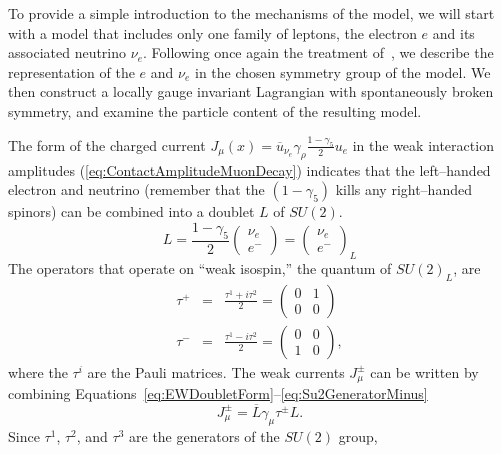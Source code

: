 To provide a simple introduction to the mechanisms of the model, we will start
with a model that includes only one family of leptons, the electron $e$ and its
associated neutrino $\nu_e$. Following once again the treatment
of~\cite{Morii:SMandBSM}, we describe the representation of the $e$ and $\nu_e$
in the chosen symmetry group of the model.  We then construct a locally gauge
invariant Lagrangian with spontaneously broken symmetry, and examine the
particle content of the resulting model.

The form of the charged current $J_\mu(x) = \overline u_{\nu_e} \gamma_\rho
\frac{1 - \gamma_5}{2} u_e$ in the weak interaction amplitudes
(\ref{eq:ContactAmplitudeMuonDecay}) indicates that the left--handed electron
and neutrino 
(remember that the $(1-\gamma_5)$ kills any right--handed spinors) can be
combined into a doublet $L$ of $SU(2)$.  
\begin{equation}
  L = \frac{1 - \gamma_5}{2}
  \left(\begin{array}{c} \nu_e \\ e^- \end{array}\right)
    = \left(\begin{array}{c} \nu_e \\ e^- \end{array}\right)_L
      \label{eq:EWDoubletForm}
\end{equation}
The operators that operate on ``weak isospin,'' the quantum of $SU(2)_L$,
are \begin{eqnarray}
  \tau^+ &=& \frac{\tau^1 + i \tau^2}{2} = 
  \left(\begin{array}{cc} 0 & 1 \\ 0 & 0 \end{array}\right) 
    \label{eq:Su2GeneratorPlus} \\
  \tau^- &=& \frac{\tau^1 - i \tau^2}{2} = 
  \left(\begin{array}{cc} 0 & 0 \\ 1 & 0 \end{array}\right),
    \label{eq:Su2GeneratorMinus}
\end{eqnarray}
where the $\tau^i$ are the Pauli matrices. The weak currents $J_\mu^\pm$ can be
written by combining
Equations~\ref{eq:EWDoubletForm}--\ref{eq:Su2GeneratorMinus}
\begin{equation}
  J_\mu^\pm = \overline L \gamma_\mu \tau^\pm L.
  \label{eq:WeakCurrentInSu2Doublets}
\end{equation}
Since $\tau^1$, $\tau^2$, and $\tau^3$ are the generators of the $SU(2)$ group,
